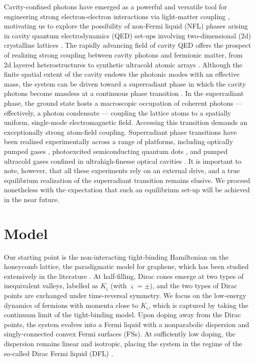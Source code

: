 Cavity-confined photons have emerged as a powerful and versatile tool 
for engineering strong electron-electron interactions via light-matter 
coupling \cite{jaksch, kollath, eckstein, farokh, demler, diehl, ahana}, 
motivating us to explore the possibility of non-Fermi liquid (NFL) 
phases arising in cavity quantum electrodynamics (QED) set-ups involving 
two-dimensional (2d) crystalline lattices \cite{roux, piazza_qed, zhang, 
piazza_superrad, bhaseen, basko, polini, pascal, peng}. The rapidly 
advancing field of cavity QED offers the prospect of realizing strong 
coupling between cavity photons and fermionic matter, from 2d layered 
heterostructures \cite{sentef} to synthetic ultracold atomic arrays 
\cite{piazza_qed, roux, zhang}. Although the finite spatial extent of 
the cavity endows the photonic modes with an effective mass, the system 
can be driven toward a superradiant phase in which the cavity photons 
become massless at a continuous phase transition \cite{piazza_superrad, 
bhaseen, basko, polini, pascal, peng}. In the superradiant phase, the 
ground state hosts a macroscopic occupation of coherent photons --- 
effectively, a photon condensate --- coupling the lattice atoms to a 
spatially uniform, single-mode electromagnetic field. Accessing this 
transition demands an exceptionally strong atom-field coupling. 
Superradiant phase transitions have been realized experimentally across 
a range of platforms, including optically pumped gases \cite{ref22cav}, 
photoexcited semiconducting quantum dots \cite{ref23cav, ref24cav}, and 
pumped ultracold gases confined in ultrahigh-finesse optical cavities 
\cite{ref25cav}. It is important to note, however, that all these 
experiments rely on an external drive, and a true equilibrium 
realization of the superradiant transition remains elusive. We proceed 
nonetheless with the expectation that such an equilibrium set-up will be 
achieved in the near future.

\section{Model}
\label{secmodel-cav}

Our starting point is the non-interacting tight-binding Hamiltonian on 
the honeycomb lattice, the paradigmatic model for graphene, which has 
been studied extensively in the literature \cite{neto}. At half-filling, 
Dirac cones emerge at two types of inequivalent valleys, labelled as $K_\varsigma$ 
(with $\varsigma = \pm$), and the two types of Dirac points are exchanged under 
time-reversal symmetry. We focus on the low-energy dynamics of fermions 
with momenta close to $K_\varsigma$, which is captured by taking the 
continuum limit of the tight-binding model. Upon doping away from the 
Dirac points, the system evolves into a Fermi liquid with a nonparabolic 
dispersion and singly-connected convex Fermi surfaces (FSs). At sufficiently 
low doping, the dispersion remains linear and isotropic, placing the 
system in the regime of the so-called Dirac Fermi liquid (DFL) 
\cite{maslov-dfl}.


